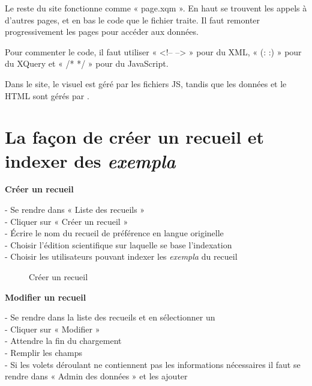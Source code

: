 	Le reste du site fonctionne comme « page.xqm ». En haut se trouvent les appels à d'autres pages, et en bas le code que le fichier traite. Il faut remonter progressivement les pages pour accéder aux données.
	
	Pour commenter le code, il faut utiliser « <!-- --> » pour du XML, « (: :) » pour du XQuery et « /* */ » pour du JavaScript.
	
	Dans le site, le visuel est géré par les fichiers JS, tandis que les données et le HTML sont gérés par .
	
	\section{La façon de créer un recueil et indexer des \textit{exempla}}
	
\textbf{Créer un recueil}
\begin{flushleft}	
	- Se rendre dans « Liste des recueils » \\
	- Cliquer sur « Créer un recueil » \\
	- Écrire le nom du recueil de préférence en langue originelle \\
	- Choisir l'édition scientifique sur laquelle se base l'indexation \\
	- Choisir les utilisateurs pouvant indexer les \textit{exempla} du recueil \\
\end{flushleft}	
	
	\begin{figure}[H]
		\centering
		\caption{Créer un recueil}
	\end{figure}

\textbf{Modifier un recueil}
\begin{flushleft}	
	- Se rendre dans la liste des recueils et en sélectionner un \\
	- Cliquer sur « Modifier » \\
	- Attendre la fin du chargement \\
	- Remplir les champs \\
	- Si les volets déroulant ne contiennent pas les informations nécessaires il faut se rendre dans « Admin des données » et les ajouter \\
\end{flushleft}	

